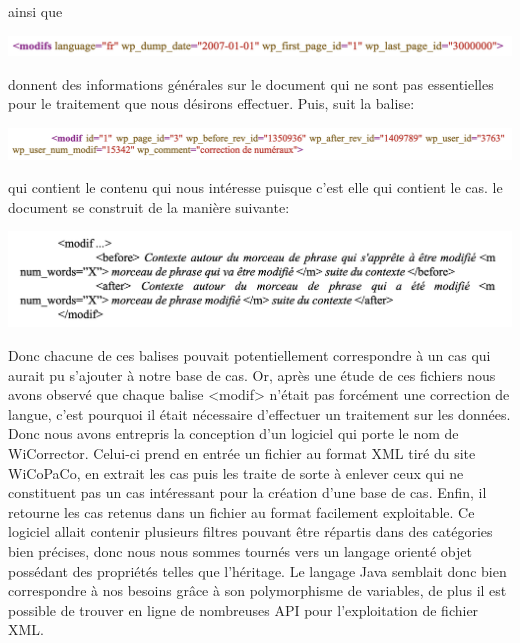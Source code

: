 \documentclass[11pt]{article}
\begin{document}
ainsi que 

\begin{center}
\includegraphics[width=14cm]{exemple6.png} %
\end{center}

donnent des informations g\'{e}n\'{e}rales sur le document qui ne sont pas essentielles pour le traitement que nous d\'{e}sirons effectuer. 
Puis, suit la balise:
\begin{center}
\includegraphics[width=14cm]{exemple7.png} %
\end{center}

qui contient le contenu qui nous int\'{e}resse puisque c'est elle qui contient le cas. le document se construit de la mani\`{e}re suivante:
\begin{center}
\includegraphics[width=14cm]{exemple8.png} %
\end{center}

Donc chacune de ces balises pouvait potentiellement correspondre \`{a} un cas qui aurait pu s'ajouter \`{a} notre base de cas. Or, apr\`{e}s une \'{e}tude de ces fichiers nous avons observ\'{e} que chaque balise <modif> n'\'{e}tait pas forc\'{e}ment une correction de langue, c'est pourquoi il \'{e}tait n\'{e}cessaire d'effectuer un traitement sur les donn\'{e}es.
\newline
\newline
Donc nous avons entrepris la conception d'un logiciel qui porte le nom de WiCorrector. Celui-ci prend en entr\'{e}e un fichier au format XML tir\'{e} du site WiCoPaCo, en extrait les cas puis les traite de sorte \`{a} enlever ceux qui ne constituent pas un cas int\'{e}ressant pour la cr\'{e}ation d'une base de cas. Enfin, il retourne les cas retenus dans un fichier au format facilement exploitable.
\newline
\newline
Ce logiciel allait contenir plusieurs filtres pouvant \^{e}tre r\'{e}partis dans des cat\'{e}gories bien pr\'{e}cises, donc nous nous sommes tourn\'{e}s vers un langage orient\'{e} objet poss\'{e}dant des propri\'{e}t\'{e}s telles que l'h\'{e}ritage. Le langage Java semblait donc bien correspondre \`{a} nos besoins gr\^{a}ce \`{a} son polymorphisme de variables, de plus il est possible de trouver en ligne de nombreuses API pour l'exploitation de fichier XML.
\newline
\newline
\end{document}
